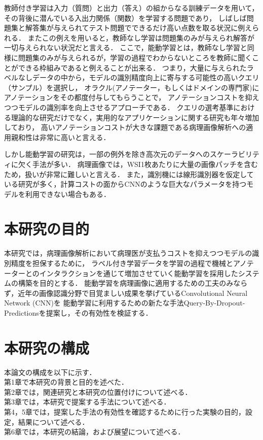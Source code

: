 教師付き学習は入力（質問）と出力（答え）の組からなる訓練データを用いて， その背後に潜んでいる入出力関係（関数）を学習する問題であり，
しばしば問題集と解答集が与えられてテスト問題でできるだけ高い点数を取る状況に例えられる．
またこの例えを用いると，教師なし学習は問題集のみが与えられ解答が一切与えられない状況だと言える．
ここで，能動学習とは，教師なし学習と同様に問題集のみが与えられるが，学習の過程でわからないところを教師に聞くことができる枠組みであると例えることが出来る．
つまり，大量に与えられたラベルなしデータの中から，モデルの識別精度向上に寄与する可能性の高いクエリ（サンプル）を選択し，
オラクル(アノテーター，もしくはドメインの専門家)にアノテーションをその都度付与してもらうことで，
アノテーションコストを抑えつつモデルの識別率を向上させるアプローチである．
クエリの選考基準における理論的な研究だけでなく，実用的なアプリケーションに関する研究も年々増加しており，
高いアノテーションコストが大きな課題である病理画像解析への適用親和性は非常に高いと言える．

しかし能動学習の研究は，一部の例外を除き高次元のデータへのスケーラビリティに欠く手法が多い．
病理画像では，WSI1枚あたりに大量の画像パッチを含むため，扱いが非常に難しいと言える．
また，識別機には線形識別器を仮定している研究が多く，計算コストの面からCNNのような巨大なパラメータを持つモデルを利用できない場合もある．

\section{本研究の目的}
本研究では，病理画像解析において病理医が支払うコストを抑えつつモデルの識別精度を担保するために，
ラベル付き学習データを学習の過程で機械とアノテーターとのインタラクションを通じて増加させていく能動学習を採用したシステムの構築を目的とする．
能動学習を病理画像に適用するための工夫のみならず，近年の画像認識分野で目覚ましい成果を挙げているConvolutional Neural Network (CNN)を
能動学習に利用するための新たな手法Query-By-Dropout-Predictionsを提案し，その有効性を検証する．


\section{本研究の構成}
本論文の構成を以下に示す．\\
第1章で本研究の背景と目的を述べた． \\
第2章では，関連研究と本研究の位置付けについて述べる．\\
第3章では，本研究で提案する手法について述べる．\\
第4，5章では，提案した手法の有効性を確認するために行った実験の目的，設定，結果について述べる．\\
第6章では，本研究の結論，および展望について述べる．

